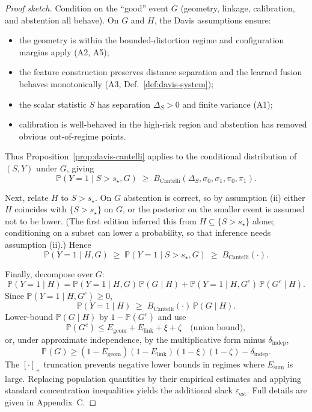 \documentclass[11pt]{article}
\newcommand{\Prob}{\mathbb{P}}
\theoremstyle{remark}
\theoremstyle{plain}
\begin{document}
\begin{proof}[Proof sketch]
Condition on the “good” event $G$ (geometry, linkage, calibration, and abstention all behave).
On $G$ and $H$, the Davis assumptions ensure:
\begin{itemize}[leftmargin=2em]
  \item the geometry is within the bounded-distortion regime and configuration margins apply
    (A2, A5);
  \item the feature construction preserves distance separation and the learned fusion behaves
    monotonically (A3, Def.~\ref{def:davis-system});
  \item the scalar statistic $S$ has separation $\Delta_S>0$ and finite variance (A1);
  \item calibration is well-behaved in the high-risk region and abstention has removed obvious
    out-of-regime points.
\end{itemize}
Thus Proposition~\ref{prop:davis-cantelli} applies to the conditional distribution of
$(S,Y)$ under $G$, giving
\[
\Prob(Y=1 \mid S>s_\star, G) \;\ge\; B_{\mathrm{Cantelli}}(\Delta_S,\sigma_0,\sigma_1,\pi_0,\pi_1).
\]

Next, relate $H$ to $S>s_\star$. On $G$ abstention is correct, so by assumption (ii) either $H$ coincides
with $\{S > s_\star\}$ on $G$, or the posterior on the smaller event is assumed not to be lower. (The first
edition inferred this from $H \subseteq \{S > s_\star\}$ alone; conditioning on a subset can lower a
probability, so that inference needs assumption (ii).) Hence
\[
\Prob(Y=1 \mid H, G)
\;\ge\;
\Prob(Y=1 \mid S>s_\star, G)
\;\ge\;
B_{\mathrm{Cantelli}}(\cdot).
\]

Finally, decompose over $G$:
\[
\Prob(Y=1 \mid H)
=
\Prob(Y=1 \mid H, G)\,\Prob(G \mid H)
+
\Prob(Y=1 \mid H, G^c)\,\Prob(G^c \mid H).
\]
Since $\Prob(Y=1 \mid H, G^c) \ge 0$,
\[
\Prob(Y=1 \mid H)
\;\ge\;
B_{\mathrm{Cantelli}}(\cdot)\,\Prob(G \mid H).
\]
Lower-bound $\Prob(G \mid H)$ by $1 - \Prob(G^c)$ and use
\[
\Prob(G^c) \le E_{\mathrm{geom}} + E_{\mathrm{link}} + \xi + \zeta
\quad\text{(union bound)},
\]
or, under approximate independence, by the multiplicative form minus $\delta_{\mathrm{indep}}$,
\[
\Prob(G) \ge (1-E_{\mathrm{geom}})(1-E_{\mathrm{link}})(1-\xi)(1-\zeta) - \delta_{\mathrm{indep}}.
\]
The $[\cdot]_+$ truncation prevents negative lower bounds in regimes where $E_{\mathrm{sum}}$
is large. Replacing population quantities by their empirical estimates and applying standard
concentration inequalities yields the additional slack $\varepsilon_{\mathrm{est}}$. Full details are
given in Appendix~C.
\end{proof}
\end{document}
